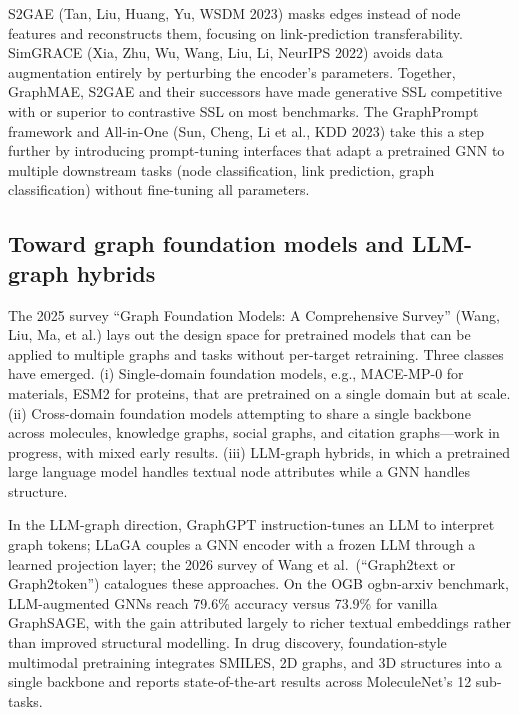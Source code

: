\documentclass{article}
\begin{document}
S2GAE (Tan, Liu, Huang, Yu, WSDM 2023) masks edges instead of node features and reconstructs them, focusing on link-prediction transferability. SimGRACE (Xia, Zhu, Wu, Wang, Liu, Li, NeurIPS 2022) avoids data augmentation entirely by perturbing the encoder's parameters. Together, GraphMAE, S2GAE and their successors have made generative SSL competitive with or superior to contrastive SSL on most benchmarks. The GraphPrompt framework \citep{liu20242025} and All-in-One (Sun, Cheng, Li et al., KDD 2023) take this a step further by introducing prompt-tuning interfaces that adapt a pretrained GNN to multiple downstream tasks (node classification, link prediction, graph classification) without fine-tuning all parameters.

\subsection{Toward graph foundation models and LLM-graph hybrids}\label{toward-graph-foundation-models-and-llm-graph-hybrids}

The 2025 survey ``Graph Foundation Models: A Comprehensive Survey'' (Wang, Liu, Ma, et al.) lays out the design space for pretrained models that can be applied to multiple graphs and tasks without per-target retraining. Three classes have emerged. (i) Single-domain foundation models, e.g., MACE-MP-0 for materials, ESM2 for proteins, that are pretrained on a single domain but at scale. (ii) Cross-domain foundation models attempting to share a single backbone across molecules, knowledge graphs, social graphs, and citation graphs---work in progress, with mixed early results. (iii) LLM-graph hybrids, in which a pretrained large language model handles textual node attributes while a GNN handles structure.

In the LLM-graph direction, GraphGPT \citep{tang20252026} instruction-tunes an LLM to interpret graph tokens; LLaGA \citep{chen2024asurveyongraphneur} couples a GNN encoder with a frozen LLM through a learned projection layer; the 2026 survey of Wang et al.~(``Graph2text or Graph2token'') catalogues these approaches. On the OGB ogbn-arxiv benchmark, LLM-augmented GNNs reach 79.6\% accuracy versus 73.9\% for vanilla GraphSAGE, with the gain attributed largely to richer textual embeddings rather than improved structural modelling. In drug discovery, foundation-style multimodal pretraining \citep{wang20252025} integrates SMILES, 2D graphs, and 3D structures into a single backbone and reports state-of-the-art results across MoleculeNet's 12 sub-tasks.
\end{document}
